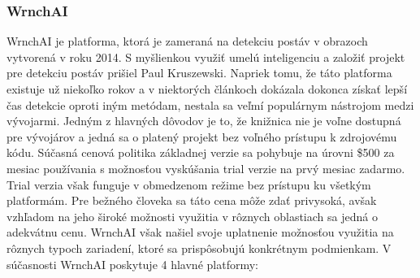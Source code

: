 \documentclass[slovak,master,dept460,male,cpp,cpdeclaration]{diploma}
\begin{document}
\subsubsection{WrnchAI}
WrnchAI je platforma, ktorá je zameraná na detekciu postáv v obrazoch vytvorená v roku 2014. S myšlienkou využiť umelú inteligenciu a založiť projekt pre detekciu postáv prišiel Paul Kruszewski. Napriek tomu, že táto platforma existuje už niekoľko rokov a v niektorých článkoch\cite{openposeVsWrnchAI} dokázala dokonca získať lepší čas detekcie oproti iným metódam,  nestala sa veľmí populárnym nástrojom medzi vývojarmi. Jedným z hlavných dôvodov je to, že knižnica nie je voľne dostupná pre vývojárov a jedná sa o platený projekt bez voľného prístupu k zdrojovému kódu. Súčasná cenová politika základnej verzie sa pohybuje na úrovni \$500 za mesiac používania s možnosťou vyskúšania trial verzie na prvý mesiac zadarmo. Trial verzia však funguje v obmedzenom režime  bez prístupu ku všetkým platformám. Pre bežného človeka sa táto cena môže zdať privysoká, avšak vzhľadom na jeho široké možnosti využitia  v rôznych oblastiach sa jedná o adekvátnu cenu. WrnchAI však našiel svoje uplatnenie možnosťou využitia na rôznych typoch zariadení, ktoré sa prispôsobujú konkrétnym podmienkam. V súčasnosti WrnchAI poskytuje 4 hlavné platformy:
\end{document}
